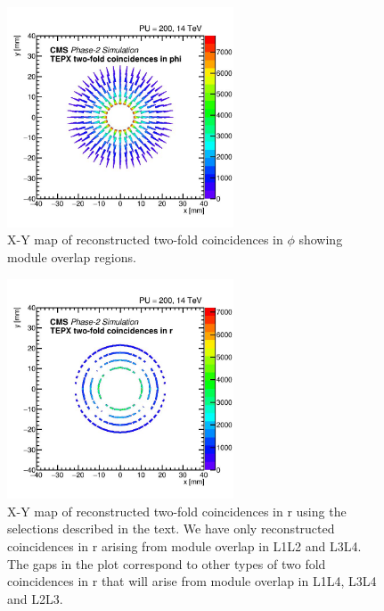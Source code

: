 \newpage

\begin{figure}[H]
\centering
\includegraphics[width=0.6\textwidth]{ashish_thesis/twofoldinphi_sch_1.png}
\caption[Map Of Two Fold Coincidences in $\phi$]{%
   X-Y map of reconstructed two-fold coincidences in $\phi$ showing module overlap regions.
}
\label{fig:cluster_ring_720}
\end{figure}


\begin{figure}[H]
\centering
\includegraphics[width=0.6\textwidth]{ashish_thesis/l1l2_l3l4_2xinr_2.png}
\caption[L1L2 and L3L4 Module Overlap Map for Two Fold Coincidences in r]{%
   X-Y map of reconstructed two-fold coincidences in r using the selections described in the text. We have only reconstructed coincidences in r arising from module overlap in L1L2 and L3L4. The gaps in the plot correspond to other types of two fold coincidences in r that will arise from module overlap in L1L4, L3L4 and L2L3.
}
\label{fig:cluster_ring_79}
\end{figure}

